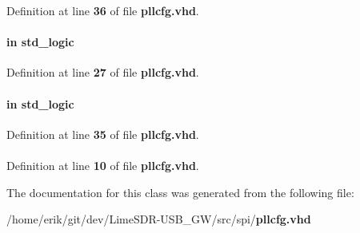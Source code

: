 Definition at line {\bf 36} of file {\bf pllcfg.\+vhd}.

\paragraph[{senA}]{ {\bfseries \textcolor{keywordflow}{in}\textcolor{vhdlchar}{ }} {\bfseries \textcolor{comment}{std\+\_\+logic}\textcolor{vhdlchar}{ }} \hspace{0.3cm}{\ttfamily [Port]}}\label{classpllcfg_aaef2763731b3fb147a2e89dad7a5a699}


Definition at line {\bf 27} of file {\bf pllcfg.\+vhd}.

\paragraph[{senB}]{ {\bfseries \textcolor{keywordflow}{in}\textcolor{vhdlchar}{ }} {\bfseries \textcolor{comment}{std\+\_\+logic}\textcolor{vhdlchar}{ }} \hspace{0.3cm}{\ttfamily [Port]}}\label{classpllcfg_a237687a5eb2d98d47f025e72bd4ae1d8}


Definition at line {\bf 35} of file {\bf pllcfg.\+vhd}.

\paragraph[{std\+\_\+logic\+\_\+1164}]{\hspace{0.3cm}{\ttfamily [Package]}}\label{classpllcfg_acd03516902501cd1c7296a98e22c6fcb}


Definition at line {\bf 10} of file {\bf pllcfg.\+vhd}.



The documentation for this class was generated from the following file\+:\begin{DoxyCompactItemize}
\item 
/home/erik/git/dev/\+Lime\+S\+D\+R-\/\+U\+S\+B\+\_\+\+G\+W/src/spi/{\bf pllcfg.\+vhd}\end{DoxyCompactItemize}
